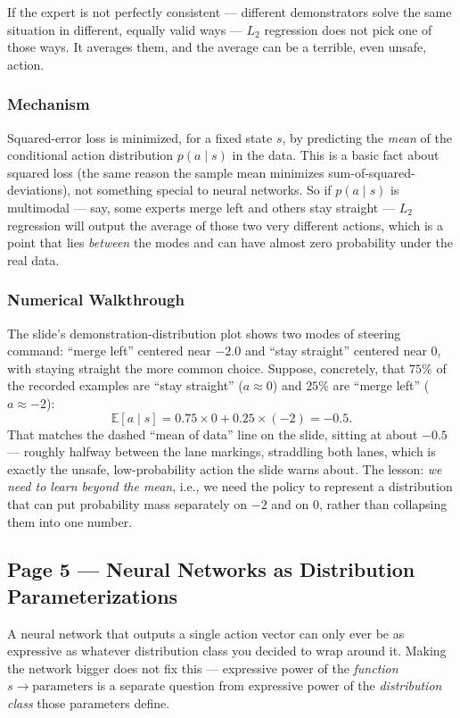 If the expert is not perfectly consistent --- different demonstrators solve the same situation in different, equally valid ways --- $L_2$ regression does not pick one of those ways. It averages them, and the average can be a terrible, even unsafe, action.

\subsubsection*{Mechanism}

Squared-error loss is minimized, for a fixed state $s$, by predicting the \emph{mean} of the conditional action distribution $p(a\mid s)$ in the data. This is a basic fact about squared loss (the same reason the sample mean minimizes sum-of-squared-deviations), not something special to neural networks. So if $p(a\mid s)$ is multimodal --- say, some experts merge left and others stay straight --- $L_2$ regression will output the average of those two very different actions, which is a point that lies \emph{between} the modes and can have almost zero probability under the real data.

\subsubsection*{Numerical Walkthrough}

The slide's demonstration-distribution plot shows two modes of steering command: ``merge left'' centered near $-2.0$ and ``stay straight'' centered near $0$, with staying straight the more common choice. Suppose, concretely, that $75\%$ of the recorded examples are ``stay straight'' ($a \approx 0$) and $25\%$ are ``merge left'' ($a \approx -2$):
\[
\mathbb{E}[a \mid s] = 0.75 \times 0 + 0.25 \times (-2) = -0.5.
\]
That matches the dashed ``mean of data'' line on the slide, sitting at about $-0.5$ --- roughly halfway between the lane markings, straddling both lanes, which is exactly the unsafe, low-probability action the slide warns about. The lesson: \emph{we need to learn beyond the mean}, i.e., we need the policy to represent a distribution that can put probability mass separately on $-2$ and on $0$, rather than collapsing them into one number.

\subsection*{Page 5 --- Neural Networks as Distribution Parameterizations}

A neural network that outputs a single action vector can only ever be as expressive as whatever distribution class you decided to wrap around it. Making the network bigger does not fix this --- expressive power of the \emph{function} $s \to \text{parameters}$ is a separate question from expressive power of the \emph{distribution class} those parameters define.

